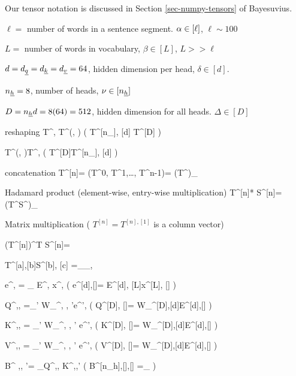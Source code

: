 \documentclass[12pt]{article}
\begin{document}
Our tensor notation is discussed in Section 
\ref{sec-numpy-tensors} of Bayesuvius.



$\ell=$ number of words in a sentence segment. $\alpha\in [\ell]$, $\ell\sim 100$

$L=$ number of words in vocabulary, $\beta\in[L]$, $L>> \ell$

$d=d_{\underline{q}}=d_{\underline{k}}=d_{\underline{v}}=64$, hidden dimension  per head,
$\delta\in[d]$. 

$n_{\underline{h}}=8$, number of heads, $\nu \in[n_{\underline{h}}]$

$D=n_{\underline{h}} d=8(64)=512$, hidden dimension for all heads. 
$\Delta\in [D]$

reshaping
\beq
T^{\nu, \delta}\rarrow T^{\Delta(\nu, \delta)}
\;\;
\left(
T^{[n_\rvh], [d]} \rarrow T^{[D]}
\right)
\eeq

\beq
T^{\Delta(\nu, \delta)}\rarrow T^{\nu, \delta}
\;\;
\left(
T^{[D]}\rarrow T^{[n_\rvh], [d]}
\right)
\eeq

concatenation
\beq
T^{[n]}= (T^0, T^1,\ldots, T^{n-1})= 
(T^\nu)_{\nu\in[n]}
\eeq

Hadamard product (element-wise, entry-wise multiplication)
\beq
T^{[n]}* S^{[n]}= (T^\nu S^\nu)_{\nu\in[n]}
\eeq


Matrix multiplication
( $T^{[n]}= T^{[n], [1]}$ is a column vector)

\beq
(T^{[n]})^T S^{[n]}=
\eeq

\beq
T^{[a],[b]}S^{[b], [c]}
=
_{\alp_\in [a], \gamma \in [c]}
\eeq


\beq
e^{\delta, \alp} = \sum_\beta 
E^{\delta, \beta}
x^{\beta, \alp}
\;\;
\left(
e^{[d],[\ell]}= E^{[d], [L]}x^{[L], [\ell]}
\right)
\eeq

\beq
Q^{\nu,\delta, \alp}=\sum_{\delta'}
W_\rvq^{\nu, \delta, \delta'}e^{\delta', \alp}
\;\;
\left(
Q^{[D], [\ell]}=
W_\rvq^{[D],[d]}E^{[d],[\ell]}
\right)
\eeq


\beq
K^{\nu,\delta, \alp}=
\sum_{\delta'}
W_\rvk^{\nu, \delta, \delta'}
e^{\delta', \alp}
\;\;
\left(
K^{[D], [\ell]}=
W_\rvk^{[D],[d]}E^{[d],[\ell]}
\right)
\eeq

\beq
V^{\nu,\delta, \alp}=
\sum_{\delta'}
W_\rvv^{\nu, \delta, \delta'}
e^{\delta', \alp}
\;\;
\left(
V^{[D], [\ell]}=
W_\rvv^{[D],[d]}E^{[d],[\ell]}
\right)
\eeq



\beq
B^{
\nu,\alp, \alp'}=
\sum_\delta Q^{\nu,\delta,\alp}
K^{\nu,\delta,\alp'}
\;\;
\left(
B^{[n_h],[\ell],[\ell]}
=_{\nu\in[n_\rvh]}
\right)
\eeq
\end{document}

